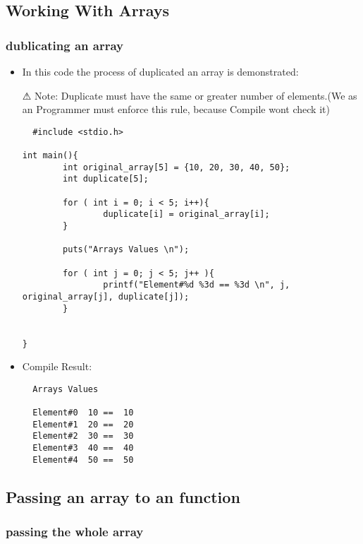 \documentclass{book}
\begin{document}


\subsection{Working With Arrays}
\subsubsection{dublicating an array}
\begin{itemize}
  \item In this code the process of duplicated an array is demonstrated:
  \item[⚠] Note: Duplicate must have the same or greater number of elements.(We as an Programmer must enforce this rule, because Compile wont check it)
\begin{lstlisting}
  #include <stdio.h>

int main(){
        int original_array[5] = {10, 20, 30, 40, 50};
        int duplicate[5];

        for ( int i = 0; i < 5; i++){
                duplicate[i] = original_array[i];
        }

        puts("Arrays Values \n");

        for ( int j = 0; j < 5; j++ ){
                printf("Element#%d %3d == %3d \n", j, original_array[j], duplicate[j]);
        }


}
\end{lstlisting}
\item Compile Result:
\begin{lstlisting}
  Arrays Values

  Element#0  10 ==  10
  Element#1  20 ==  20
  Element#2  30 ==  30
  Element#3  40 ==  40
  Element#4  50 ==  50
\end{lstlisting}

\end{itemize}


\subsection{Passing an array to an function}


\subsubsection{passing the whole array}
\end{document}
